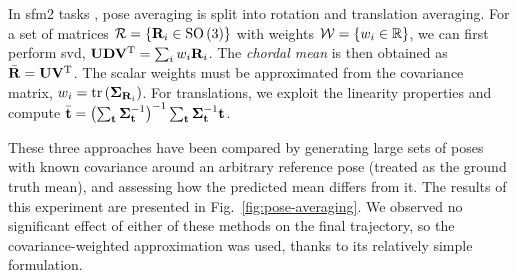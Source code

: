 \newcommand{\vectm}{\vecx{t}}
In \acrfull{sfm2} tasks \cite{pan2024global}, pose averaging is split into rotation and translation averaging.
For a set of matrices $\mathcal{R} = \left\{\mathbf{R}_i \in \operatorname{SO}\left(3\right)\right\}$ with weights $\mathcal{W} = \left\{w_i \in {\mathbb{R}}\right\}$,
we can first perform \acrfull{svd}, $\mathbf{U}\mathbf{D}{\mathbf{V}}^\text{T}=\sum_{i} w_i \mathbf{R}_i$. The \emph{chordal mean} \cite{hartley2013rotation} is then obtained as \mbox{$\bar{\mathbf{R}}=\mathbf{U}{\mathbf{V}}^\text{T}$}. The scalar weights must be approximated from the covariance matrix, \eg $w_i = \text{tr}\left(\mathbf{\Sigma}_{\mathbf{R}_i}\right)$. For translations, we exploit the linearity properties and compute \mbox{$
		\bar{\vecx{t}}=
		\left(\sum_{\vectm}\matx{\Sigma}_{\vectm}^{-1}\right)^{-1}
		\sum_{\vectm}\matx{\Sigma}_{\vectm}^{-1}\vectm
	$}.

These three approaches have been compared by generating large sets of poses with known covariance around an arbitrary reference pose (treated as the ground truth mean), and assessing how the predicted mean differs from it. The results of this experiment are presented in Fig.~\ref{fig:pose-averaging}. We observed no significant effect of either of these methods on the final trajectory, so the covariance-weighted approximation was used, thanks to its relatively simple formulation.

